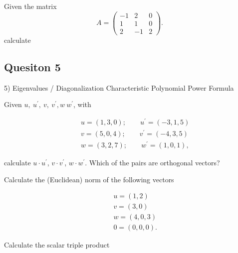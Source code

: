  Given the  matrix 
\begin{equation*}
A=\left( \begin{array}{rrr}
-1 & 2 & 0\\
1 & 1 & 0\\
2 & -1 & 2
\end{array} \right).
\end{equation*}
calculate
\subsection*{Quesiton 5}
5) Eigenvalues / Diagonalization
	Characteristic Polynomial
	Power Formula

\item Given
$u,\:u^{\prime},\:v,\:v^{\prime},w\:w^{\prime}$, with

\begin{eqnarray*}
& & u=(1,3,0);\qquad u^{\prime}=(-3,1,5)\\
& & v=(5,0,4);\qquad v^{\prime}=(-4,3,5)\\
& & w=(3,2,7);\qquad w^{\prime}=(1,0,1),
\end{eqnarray*}

calculate $u\cdot u^{\prime}$, $v\cdot v^{\prime}$, $w\cdot
w^{\prime}$. Which of the pairs are orthogonal vectors?

\vspace{0.25cm}\item Calculate the (Euclidean) norm of the
following vectors

\begin{eqnarray*}
& & u=(1,2)\\
& & v=(3,0)\\
& & w=(4,0,3)\\
& & 0=(0,0,0).
\end{eqnarray*}
\item Calculate the scalar triple product

